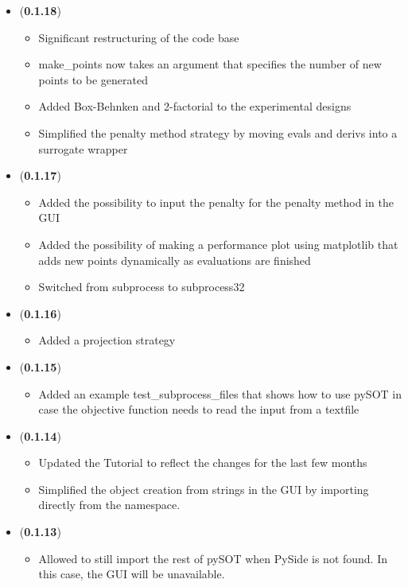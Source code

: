 \documentclass[]{article}
\begin{document}
\begin{itemize}
	\item (\textbf{0.1.18})
	\begin{itemize}
		\item Significant restructuring of the code base
		\item make\_points now takes an argument that specifies the number of new points to be generated
		\item Added Box-Behnken and 2-factorial to the experimental designs
		\item Simplified the penalty method strategy by moving evals and derivs into a surrogate wrapper
	\end{itemize}

	\item (\textbf{0.1.17})
	\begin{itemize}
		\item Added the possibility to input the penalty for the penalty method in the GUI
		\item Added the possibility of making a performance plot using matplotlib that adds new points 
		dynamically as evaluations are finished
		\item Switched from subprocess to subprocess32
	\end{itemize}

	\item (\textbf{0.1.16})
	\begin{itemize}
		\item Added a projection strategy
	\end{itemize}

	\item (\textbf{0.1.15})
	\begin{itemize}
		\item Added an example test\_subprocess\_files that shows how to use pySOT in 
		case the objective function needs to read the input from a textfile
	\end{itemize}

	\item (\textbf{0.1.14}) 
	\begin{itemize}
		\item Updated the Tutorial to reflect the changes for the last few months
		\item Simplified the object creation from strings in the GUI by importing directly from the namespace.
	\end{itemize}

	\item (\textbf{0.1.13}) 
	\begin{itemize}
		\item Allowed to still import the rest of pySOT when PySide is not found. In this case, the 
		GUI will be unavailable.
	\end{itemize}


\end{itemize}
\end{document}
